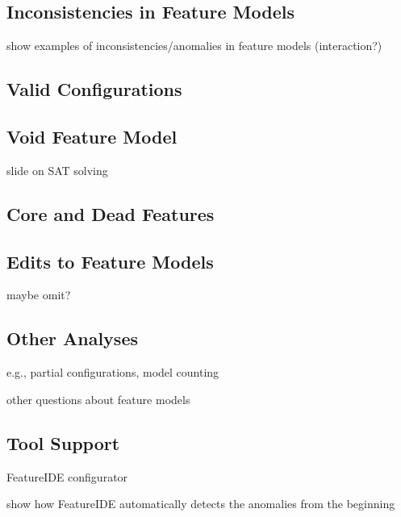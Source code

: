 \subsection{Inconsistencies in Feature Models}

show examples of inconsistencies/anomalies in feature models (interaction?)

\subsection{Valid Configurations}

\subsection{Void Feature Model}

slide on SAT solving

\subsection{Core and Dead Features}

\subsection{Edits to Feature Models}

maybe omit?

\subsection{Other Analyses}

e.g., partial configurations, model counting

other questions about feature models

\subsection{Tool Support}

FeatureIDE configurator

show how FeatureIDE automatically detects the anomalies from the beginning
